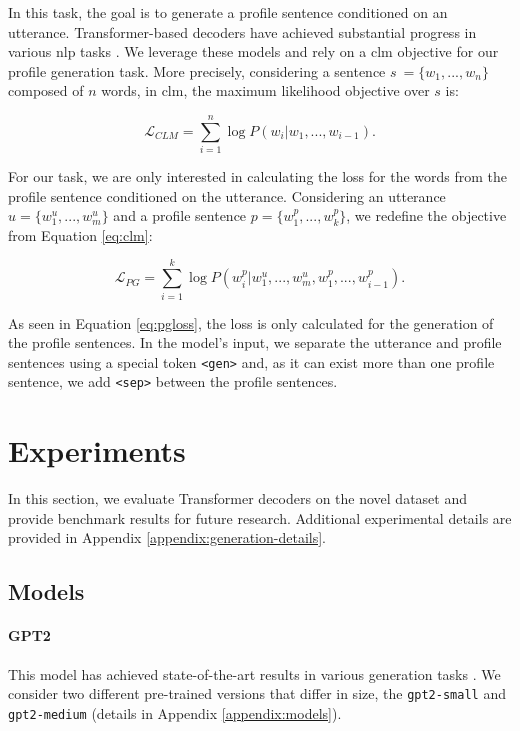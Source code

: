 \documentclass[11pt]{article}
\begin{document}
In this task, the goal is to generate a profile sentence conditioned on an utterance.
Transformer-based decoders have achieved substantial progress in various \gls*{nlp} tasks \cite{GPT2}.
We leverage these models and rely on a \gls*{clm} objective for our profile generation task.
More precisely, considering a sentence \(s\ = \{w_1, ..., w_n\}\) composed of \(n\) words, in \gls*{clm}, the maximum likelihood objective over \(s\) is:

\begin{equation}
\label{eq:clm}
    \mathcal{L}_{CLM} = \sum_{i=1}^{n} \log P(w_i|w_1,...,w_{i-1}).
\end{equation}

For our task, we are only interested in calculating the loss for the words from the profile sentence conditioned on the utterance.
Considering an utterance \(u = \{w_1^u,..., w_m^u\}\) and a profile sentence \(p = \{w_1^p,..., w_k^p\}\), we redefine the objective from Equation \ref{eq:clm}:

\begin{equation}
\label{eq:pgloss}
    \mathcal{L}_{PG} = \sum_{i=1}^{k} \log P(w_i^p|w_1^u,...,w_m^u,w_1^p,...,w_{i-1}^p).
\end{equation}

As seen in Equation \ref{eq:pgloss}, the loss is only calculated for the generation of the profile sentences.
In the model's input, we separate the utterance and profile sentences using a special token \texttt{<gen>} and, as it can exist more than one profile sentence, we add \texttt{<sep>} between the profile sentences.


\section{Experiments}

In this section, we evaluate Transformer decoders on the novel dataset and provide benchmark results for future research.
Additional experimental details are provided in Appendix \ref{appendix:generation-details}.

\subsection{Models}

\paragraph{GPT2} This model has achieved state-of-the-art results in various generation tasks \cite{GPT2}. We consider two different pre-trained versions that differ in size, the \texttt{gpt2-small} and \texttt{gpt2-medium} (details in Appendix \ref{appendix:models}).
\end{document}
